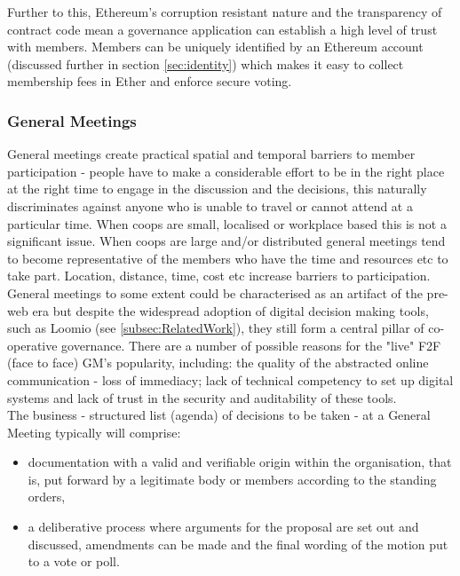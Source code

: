 Further to this, Ethereum's corruption resistant nature and the transparency of contract code mean a governance application can establish a high level of trust with members. Members can be uniquely identified by an Ethereum account (discussed further in section \ref{sec:identity}) which makes it easy to collect membership fees in Ether and enforce secure voting.\\

\subsubsection{General Meetings}
General meetings create practical spatial and temporal barriers to member participation - people have to make a considerable effort to be in the right place at the right time to engage in the discussion and the decisions, this naturally discriminates against anyone who is unable to travel or cannot attend at a particular time.  When coops are small, localised or workplace based this is not a significant issue.  When coops are large and/or distributed general meetings tend to become representative of the members who have the time and resources etc to take part. Location, distance, time, cost etc increase barriers to participation. General meetings to some extent could be characterised as an artifact of the pre-web era but despite the widespread adoption of digital decision making tools, such as Loomio (see \ref{subsec:RelatedWork}), they still form a central pillar of co-operative governance. There are a number of possible reasons for the "live" F2F (face to face) GM's popularity, including: the quality of the abstracted online communication - loss of immediacy; lack of technical competency to set up digital systems and lack of trust in the security and auditability of these tools. \\

The business - structured list (agenda) of decisions to be taken - at a General Meeting typically will comprise:
\begin{itemize}
\item documentation with a valid and verifiable origin within the organisation, that is, put forward by a legitimate body or members according to the standing orders,
\item a deliberative process where arguments for the proposal are set out and discussed, amendments can be made and the final wording of the motion put to a vote or poll.
\end{itemize}

